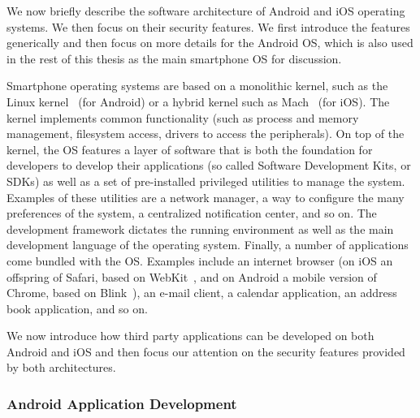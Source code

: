 We now briefly describe the software architecture of Android and iOS operating systems. We then focus on their security features. We first introduce the features generically and then focus on more details for the Android OS, which is also used in the rest of this thesis as the main smartphone OS for discussion.

Smartphone operating systems are based on a monolithic kernel, such as the
Linux kernel~\cite{androidkernel} (for Android) or a hybrid kernel such as
Mach~\cite{machkernel} (for iOS). The kernel implements common functionality
(such as process and memory management, filesystem access, drivers to access
the peripherals). On top of the kernel, the OS features a layer of software
that is both the foundation for developers to develop their applications (so
called Software Development Kits, or SDKs) as well as a set of pre-installed
privileged utilities to manage the system. Examples of these utilities are a
network manager, a way to configure the many preferences of the system, a
centralized notification center, and so on. The development framework dictates
the running environment as well as the main development language of the
operating system. Finally, a number of applications come bundled with the OS.
Examples include an internet browser (on iOS an offspring of Safari, based on WebKit~\cite{webkit}, and on Android a mobile version of Chrome, based on Blink~\cite{blink}), an e-mail client, a calendar application, an address book application, and so on.

We now introduce how third party applications can be developed on both Android and iOS and then focus our attention on the security features provided by both architectures.

\subsubsection*{Android Application Development}

